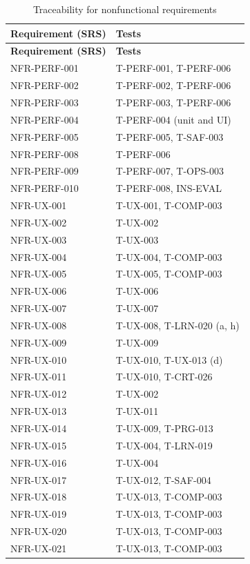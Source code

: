 \documentclass[12pt, titlepage]{article}
\begin{document}
{\small
\begin{longtable}{@{}>{\raggedright\arraybackslash}p{}>{\raggedright\arraybackslash}p{}@{}}
\caption{Traceability for nonfunctional requirements}
\label{tab:trace-nfr}\\
\toprule
\textbf{Requirement (SRS)} & \textbf{Tests}\\
\midrule
\endfirsthead
\toprule
\textbf{Requirement (SRS)} & \textbf{Tests}\\
\midrule
\endhead
NFR-PERF-001 & T-PERF-001, T-PERF-006\\
NFR-PERF-002 & T-PERF-002, T-PERF-006\\
NFR-PERF-003 & T-PERF-003, T-PERF-006\\
NFR-PERF-004 & T-PERF-004 (unit and UI)\\
NFR-PERF-005 & T-PERF-005, T-SAF-003\\
NFR-PERF-008 & T-PERF-006\\
NFR-PERF-009 & T-PERF-007, T-OPS-003\\
NFR-PERF-010 & T-PERF-008, INS-EVAL\\
NFR-UX-001 & T-UX-001, T-COMP-003\\
NFR-UX-002 & T-UX-002\\
NFR-UX-003 & T-UX-003\\
NFR-UX-004 & T-UX-004, T-COMP-003\\
NFR-UX-005 & T-UX-005, T-COMP-003\\
NFR-UX-006 & T-UX-006\\
NFR-UX-007 & T-UX-007\\
NFR-UX-008 & T-UX-008, T-LRN-020 (a, h)\\
NFR-UX-009 & T-UX-009\\
NFR-UX-010 & T-UX-010, T-UX-013 (d)\\
NFR-UX-011 & T-UX-010, T-CRT-026\\
NFR-UX-012 & T-UX-002\\
NFR-UX-013 & T-UX-011\\
NFR-UX-014 & T-UX-009, T-PRG-013\\
NFR-UX-015 & T-UX-004, T-LRN-019\\
NFR-UX-016 & T-UX-004\\
NFR-UX-017 & T-UX-012, T-SAF-004\\
NFR-UX-018 & T-UX-013, T-COMP-003\\
NFR-UX-019 & T-UX-013, T-COMP-003\\
NFR-UX-020 & T-UX-013, T-COMP-003\\
NFR-UX-021 & T-UX-013, T-COMP-003\\

\end{longtable}}
\end{document}
